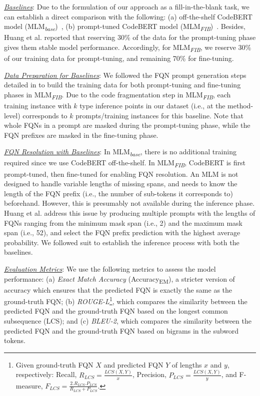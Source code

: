 \noindent\underline{\textit{Baselines}}: Due to the formulation of our approach as a fill-in-the-blank task, we can establish a direct comparison with the following: (a) off-the-shelf CodeBERT model (MLM\textsubscript{\textit{base}})~\cite{codebert}, (b) prompt-tuned CodeBERT model (MLM\textsubscript{\textit{FIB}})~\cite{prompt-ase22}. Besides, Huang et al. reported that reserving 30\% of the data for the prompt-tuning phase gives them stable model performance. Accordingly, for MLM\textsubscript{\textit{FIB}}, we reserve 30\% of our training data for prompt-tuning, and remaining 70\% for fine-tuning.

\noindent\underline{\textit{Data Preparation for Baselines}}: We followed the FQN prompt generation steps detailed in \cite{prompt-ase22} to build the training data for both prompt-tuning and fine-tuning phases in MLM\textsubscript{\textit{FIB}}. Due to the code fragmentation step in MLM\textsubscript{\textit{FIB}}, each training instance with $k$ type inference points in our dataset (i.e., at the method-level) corresponds to $k$ prompts/training instances for this baseline. Note that whole FQNs in a prompt are masked during the prompt-tuning phase, while the FQN prefixes are masked in the fine-tuning phase.

\noindent\underline{\textit{FQN Resolution with Baselines}}: In MLM\textsubscript{\textit{base}}, there is no additional training required since we use CodeBERT off-the-shelf. In MLM\textsubscript{\textit{FIB}}, CodeBERT is first prompt-tuned, then fine-tuned for enabling FQN resolution. An MLM is not designed to handle variable lengths of missing spans, and needs to know the length of the FQN prefix (i.e., the number of sub-tokens it corresponds to) beforehand. However, this is presumably not available during the inference phase. Huang et al. address this issue by producing multiple prompts with the lengths of FQNs ranging from the minimum mask span (i.e., 2) and the maximum mask span (i.e., 52), and select the FQN prefix prediction with the highest average probability. We followed suit to establish the inference process with both the baselines.

\noindent\underline{\textit{Evaluation Metrics}}: We use the following metrics to assess the model performance: (a) \textit{Exact Match Accuracy} (Accuracy\textsubscript{EM}), a stricter version of accuracy which ensures that the predicted FQN is exactly the same as the ground-truth FQN; (b) \textit{ROUGE-L}\footnote{Given ground-truth FQN $X$ and predicted FQN $Y$ of lengths $x$ and $y$, respectively: Recall, $R_{LCS}=\frac{LCS(X, Y)}{x}$, Precision, $P_{LCS}=\frac{LCS(X, Y)}{y}$, and F-measure, $F_{LCS}=\frac{2.R_{LCS}.P_{LCS}}{R_{LCS}+P_{LCS}}$.}, which compares the similarity between the predicted FQN and the ground-truth FQN based on the longest common subsequence (LCS); and (c) \textit{BLEU-2}, which compares the similarity between the predicted FQN and the ground-truth FQN based on bigrams in the subword tokens.


